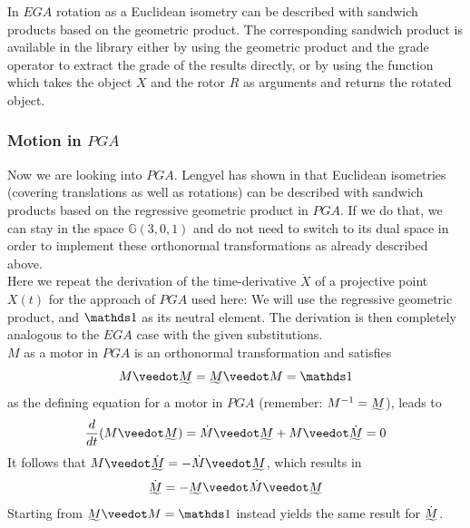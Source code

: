 In $EGA$ rotation as a Euclidean isometry can be described with sandwich products based on
the geometric product. The corresponding sandwich product is available in the library
either by using the geometric product and the grade operator to extract the grade of the
results directly, or by using the function  which takes the object $X$
and the rotor $R$ as arguments and returns the rotated object.\\


\newpage

\subsubsection{Motion in $PGA$}
\label{subsection:motion_PGA}

Now we are looking into $PGA$. Lengyel has shown in \cite{Lengyel_pga-illuminated:2024}
that Euclidean isometries (covering translations as well as rotations) can be described
with sandwich products based on the regressive geometric product in $PGA$. If we do that,
we can stay in the space $\mathbb{G}(3,0,1)$ and do not need to switch to its dual space
in order to implement these orthonormal transformations as already described above. \\

Here we repeat the derivation of the time-derivative $\dot{X}$ of a projective point
$X(t)$ for the approach of $PGA$ used here: We will use the regressive geometric product,
and $\ps$ as its neutral element. The derivation is then completely analogous to the $EGA$
case with the given substitutions. \\

$M$ as a motor in $PGA$ is an orthonormal transformation and satisfies
\begin{equation}
M \veedot \rrev{M} = \rrev{M} \veedot M = \ps
\label{eq:motor_relation_rgpr_neutral_element}
\end{equation}
as the defining equation for a motor in $PGA$ (remember: $M^{-1} = \rrev{M}$), leads to 
\begin{equation}
   \frac{d}{dt}(M\veedot\rrev{M}) = \dot{M}\veedot\rrev{M} + M\veedot\dot{\rrev{M}} = 0
   \label{eq:dot_rrev_m}
\end{equation}
It follows that $M\veedot\dot{\rrev{M}} = -\dot{M}\veedot\rrev{M}$, which results in
\begin{equation}
   \dot{\rrev{M}} = -\rrev{M}\veedot\dot{M}\veedot\rrev{M}
   \label{eq:dot_rrev_m_as_dot_m}
\end{equation}
Starting from $\rrev{M} \veedot M = \ps$ instead yields the same result for
$\dot{\rrev{M}}$. \\

